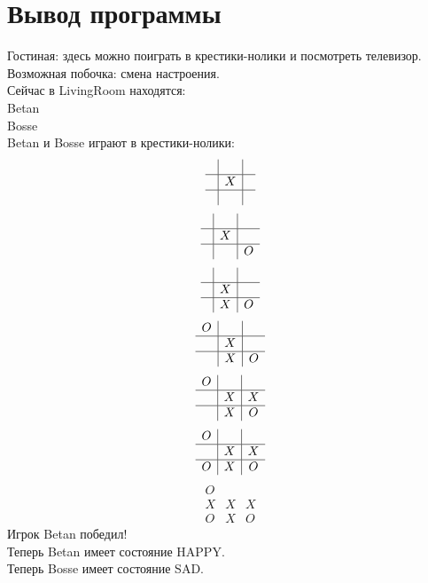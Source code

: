 \section{Вывод программы}
Гостиная: здесь можно поиграть в крестики-нолики и посмотреть телевизор. Возможная побочка: смена настроения. \\
Сейчас в LivingRoom находятся: \\
Betan \\
Bosse \\
Betan и Bosse играют в крестики-нолики: \\
\[
\begin{array}{c|c|c}
   &   &   \\
\hline
   & X &   \\
\hline
   &   &  
\end{array}
\]
\[
\begin{array}{c|c|c}
   &   &   \\
\hline
   & X &   \\
\hline
   &   & O 
\end{array}
\]
\[
\begin{array}{c|c|c}
   &   &   \\
\hline
   & X &   \\
\hline
   & X & O 
\end{array}
\]
\[
\begin{array}{c|c|c}
 O &   &   \\
\hline
   & X &   \\
\hline
   & X & O 
\end{array}
\]
\[
\begin{array}{c|c|c}
 O &   &   \\
\hline
   & X & X \\
\hline
   & X & O 
\end{array}
\]
\[
\begin{array}{c|c|c}
 O &   &   \\
\hline
   & X & X \\
\hline
 O & X & O 
\end{array}
\]
\[
\begin{array}{c|c|c}
 O &   &   \\
\hline
 X & X & X \\
\hline
 O & X & O 
\end{array}
\]
Игрок Betan победил! \\
Теперь Betan имеет состояние HAPPY. \\
Теперь Bosse имеет состояние SAD. \\

